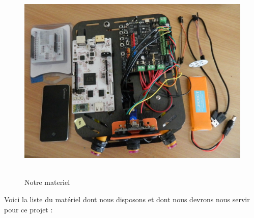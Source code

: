 \documentclass[12pt,francais]{report}
\begin{document}
\begin{figure}[!h]
\includegraphics[scale=0.4]{./images/notre_materiel.jpg}~\
\caption{Notre materiel}
\end{figure}
	
Voici la liste du matériel dont nous disposons et dont nous devrons nous servir pour ce projet :
\end{document}
